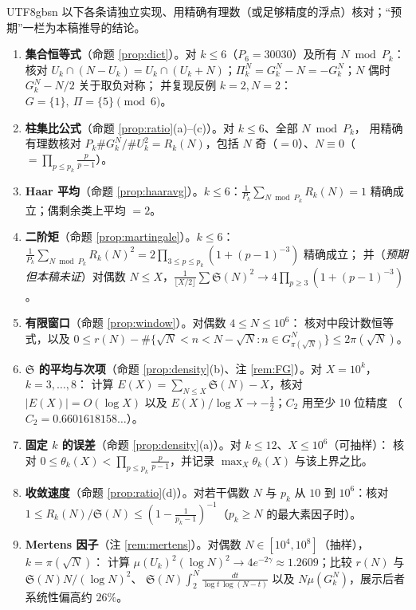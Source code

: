 \documentclass[11pt,a4paper]{article}
\newcommand{\Haar}{\mu}
\newcommand{\Sing}{\mathfrak S}
\theoremstyle{plain}
\theoremstyle{definition}
\begin{document}
\begin{CJK}{UTF8}{gbsn}
以下各条请独立实现、用精确有理数（或足够精度的浮点）核对；“预期”一栏为本稿推导的结论。
\begin{enumerate}[label=\textbf{V\arabic*.},leftmargin=*]
\item \textbf{集合恒等式}（命题 \ref{prop:dict}）。对 $k\le6$（$P_6=30030$）及所有 $N\bmod P_k$：
核对 $U_k\cap(N-U_k)=U_k\cap(U_k+N)$；$\Pi_k^N=G_k^N-N=-G_k^N$；$N$ 偶时 $G_k^N-N/2$ 关于取负对称；
并复现反例 $k=2,N=2$：$G=\{1\},\ \Pi=\{5\}\pmod 6$。
\item \textbf{柱集比公式}（命题 \ref{prop:ratio}(a)--(c)）。对 $k\le6$、全部 $N\bmod P_k$，
用精确有理数核对 $P_k\#G_k^N/\#U_k^2=R_k(N)$，包括 $N$ 奇（$=0$）、$N\equiv0$（$=\prod_{p\le p_k}\frac p{p-1}$）。
\item \textbf{Haar 平均}（命题 \ref{prop:haaravg}）。$k\le6$：$\frac1{P_k}\sum_{N\bmod P_k}R_k(N)=1$ 精确成立；偶剩余类上平均 $=2$。
\item \textbf{二阶矩}（命题 \ref{prop:martingale}）。$k\le6$：$\frac1{P_k}\sum_{N\bmod P_k}R_k(N)^2=2\prod_{3\le p\le p_k}(1+(p-1)^{-3})$ 精确成立；
并（\emph{预期但本稿未证}）对偶数 $N\le X$，$\frac1{\lfloor X/2\rfloor}\sum\Sing(N)^2\to 4\prod_{p\ge3}(1+(p-1)^{-3})$。
\item \textbf{有限窗口}（命题 \ref{prop:window}）。对偶数 $4\le N\le10^6$：
核对中段计数恒等式，以及 $0\le r(N)-\#\{\sqrt N<n<N-\sqrt N: n\in G_{\pi(\sqrt N)}^N\}\le2\pi(\sqrt N)$。
\item \textbf{$\Sing$ 的平均与次项}（命题 \ref{prop:density}(b)、注 \ref{rem:FG}）。对 $X=10^k$，$k=3,\dots,8$：
计算 $E(X)=\sum_{N\le X}\Sing(N)-X$，核对 $|E(X)|=O(\log X)$ 以及 $E(X)/\log X\to-\tfrac12$；$C_2$ 用至少 10 位精度
（$C_2=0.6601618158\ldots$）。
\item \textbf{固定 $k$ 的误差}（命题 \ref{prop:density}(a)）。对 $k\le12$、$X\le10^6$（可抽样）：
核对 $0\le\theta_k(X)<\prod_{p\le p_k}\frac p{p-1}$，并记录 $\max_X\theta_k(X)$ 与该上界之比。
\item \textbf{收敛速度}（命题 \ref{prop:ratio}(d)）。对若干偶数 $N$ 与 $p_k$ 从 $10$ 到 $10^6$：核对
$1\le R_k(N)/\Sing(N)\le(1-\frac1{p_k-1})^{-1}$（$p_k\ge N$ 的最大素因子时）。
\item \textbf{Mertens 因子}（注 \ref{rem:mertens}）。对偶数 $N\in[10^4,10^8]$（抽样），$k=\pi(\sqrt N)$：
计算 $\Haar(U_k)^2(\log N)^2\to4e^{-2\gamma}\approx1.2609$；比较 $r(N)$ 与 $\Sing(N)N/(\log N)^2$、
$\Sing(N)\int_2^N\frac{dt}{\log t\,\log(N-t)}$ 以及 $N\Haar(G_k^N)$，展示后者系统性偏高约 $26\%$。
\end{enumerate}


\end{CJK}
\end{document}
